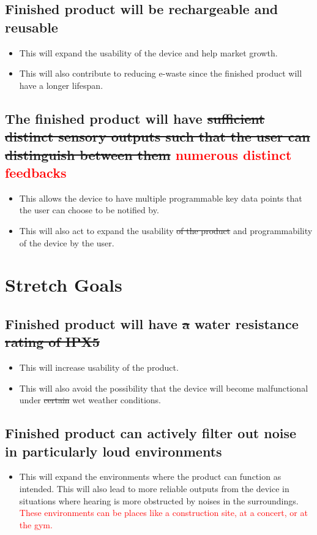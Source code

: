 \documentclass[12pt, titlepage]{article}
\begin{document}
 \subsection{Finished product will be rechargeable and
 reusable}
 \begin{itemize}
    \item This will expand the usability of the device and help market growth.
    \item This will also contribute to reducing e-waste since the finished product will have a longer lifespan.
 \end{itemize} 

 \subsection{The finished product will have \sout{sufficient distinct sensory outputs such that the user can distinguish between them} \textcolor{red}{numerous distinct feedbacks}}
 \begin{itemize}
    \item This allows the device to have multiple programmable key data points that the user can choose to be notified by.
    \item This will also act to expand the usability \sout{of the product} and programmability of the device by the user. 
 \end{itemize} 

\section{Stretch Goals}

\subsection{Finished product will have \sout{a} water resistance \sout{rating of IPX5}}
\begin{itemize}
    \item This will increase usability of the product.
    \item This will also avoid the possibility that the device will become malfunctional under \sout{certain} wet weather conditions.
 \end{itemize} 


\subsection{Finished product can actively filter out noise in particularly loud environments}
\begin{itemize}
    \item This will expand the environments where
    the product can function as intended.
    This will also lead to more reliable
    outputs from the device in situations
    where hearing is more obstructed by
    noises in the surroundings. 
    \textcolor{red}{These environments can be places like a construction site, at a concert, or at the gym.}
\end{itemize}
\end{document}
